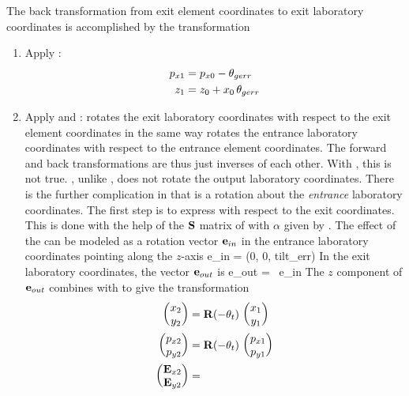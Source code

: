 The back transformation from exit element coordinates to exit
laboratory coordinates is accomplished by the transformation
  \begin{enumerate}
  \item
Apply :
\begin{align}
  p_{x1} &= p_{x0} - \theta_{gerr} \nonumber \\
  z_1    &= z_0 + x_0 \, \theta_{gerr} 
\end{align}
  \item
Apply  and :  rotates the exit
laboratory coordinates with respect to the exit element coordinates in
the same way  rotates the entrance laboratory coordinates
with respect to the entrance element coordinates. The forward and back
transformations are thus just inverses of each other.  With
, this is not true. , unlike , does
not rotate the output laboratory coordinates.  There is the further
complication in that  is a rotation about the {\em
entrance} laboratory coordinates. The first step is to express
 with respect to the exit coordinates. This is done with
the help of the ${\bf S}$ matrix of  with $\alpha$ given by
. The effect of the  can be modeled as a rotation
vector ${\bf e}_{in}$ in the entrance laboratory coordinates pointing
along the $z$-axis
\Begineq
 \Bf e_{in} = (0, 0, \mbox{tilt_err})
\Endeq
In the exit laboratory coordinates, the vector ${\bf e}_{out}$ is
\Begineq
  \Bf e_{out} = \bfS \, \Bf e_{in}
\Endeq
The $z$ component of ${\bf e}_{out}$ combines with  to give
the transformation
\begin{align}
  \begin{pmatrix} x_2 \\ y_2 \end{pmatrix} &=
    \bfR (-\theta_{t}) \,   \begin{pmatrix} x_1 \\ y_1 \end{pmatrix} \CRNO
  \begin{pmatrix} p_{x2} \\ p_{y2} \end{pmatrix} &=
    \bfR (-\theta_{t}) \,   \begin{pmatrix} p_{x1} \\ p_{y1} \end{pmatrix} \\
  \begin{pmatrix} \bfE_{x2} \\ \bfE_{y2} \end{pmatrix} &=

\end{align}
\end{enumerate}
